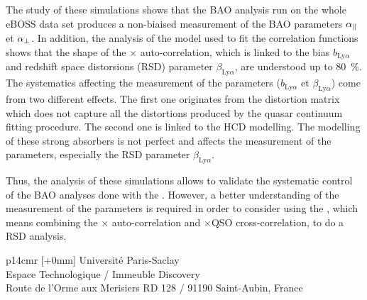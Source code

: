 \begin{mdframed}[linecolor=Prune,linewidth=1]
\begin{small}
\begin{multicols}{2}
  The study of these simulations shows that the BAO analysis run on the whole \lya{} eBOSS data set produces a non-biaised measurement of the BAO parameters $\alpha_{\parallel}{}$ et $\alpha_{\perp}{}$.
  In addition, the analysis of the model used to fit the correlation functions shows that the shape of the \lya{}$\times$\lya{} auto-correlation, which is linked to the bias $b_{\mathrm{Ly}\alpha}$ and redshift space distorsions (RSD) parameter $\beta_{\mathrm{Ly}\alpha}$, are understood up to \SI{80}{\percent}.
  The systematics affecting the measurement of the \lya{} parameters ($b_{\mathrm{Ly}\alpha}$ et $\beta_{\mathrm{Ly}\alpha}$) come from two different effects.
  The first one originates from the distortion matrix which does not capture all the distortions produced by the quasar continuum fitting procedure.
  The second one is linked to the HCD modelling.
  The modelling of these strong absorbers is not perfect and affects the measurement of the \lya{} parameters, especially the RSD parameter $\beta_{\mathrm{Ly}\alpha}$.

  Thus, the analysis of these simulations allows to validate the systematic control of the BAO analyses done with the \lya{}.
  However, a better understanding of the measurement of the \lya{} parameters is required in order to consider using the \lya{}, which means combining the \lya{}$\times$\lya{} auto-correlation and \lya{}$\times$QSO cross-correlation, to do a RSD analysis.
\end{multicols}
\end{small}
\end{mdframed}

\vspace{3cm} %
\selectfont
\begin{tabular}{p{14cm}r}
[+0mm]{{\color{Prune} Université Paris-Saclay\\
Espace Technologique / Immeuble Discovery\\
  Route de l’Orme aux Merisiers RD 128 / 91190 Saint-Aubin, France}} \\
\end{tabular}
